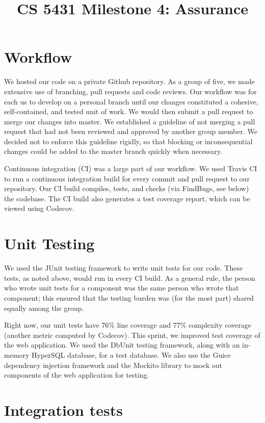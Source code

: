 \documentclass[a4paper,12pt]{article}
\title{CS 5431 Milestone 4: Assurance}
\author{
\iam{James Cassell}{jcc384}
\and
\iam{Evan King}{esk79}
\and
\iam{Ethan Koenig}{etk39}
\and
\iam{Eric Perdew}{ecp84}
\and
\iam{Will Ronchetti}{wrr33}
}
\begin{document}
\maketitle

\section{Workflow}
We hosted our code on a private Github repository. As a group of five, we made extensive use of branching, pull requests and code reviews. Our workflow was for each us to develop on a personal branch until our changes constituted a cohesive, self-contained, and tested unit of work. We would then submit a pull request to merge our changes into master. We established a guideline of not merging a pull request that had not been reviewed and approved by another group member. We decided not to enforce this guideline rigidly, so that blocking or inconsequential changes could be added to the master branch quickly when necessary.

Continuous integration (CI) was a large part of our workflow. We used Travis CI to run a continuous integration build for every commit and pull request to our repository. Our CI build compiles, tests, and checks (via FindBugs, see below) the codebase. The CI build also generates a test coverage report, which can be viewed using Codecov.

\section{Unit Testing}

We used the JUnit testing framework to write unit tests for our code. These tests, as noted above, would run in every CI build. As a general rule, the person who wrote unit tests for a component was the same person who wrote that component; this ensured that the testing burden was (for the most part) shared equally among the group.

Right now, our unit tests have 76\% line coverage and 77\% complexity coverage (another metric computed by Codecov). This sprint, we improved test coverage of the web application. We used the DbUnit testing framework, along with an in-memory HyperSQL database, for a test database. We also use the Guice dependency injection framework and the Mockito library to mock out components of the web application for testing.

\section{Integration tests}
\end{document}
